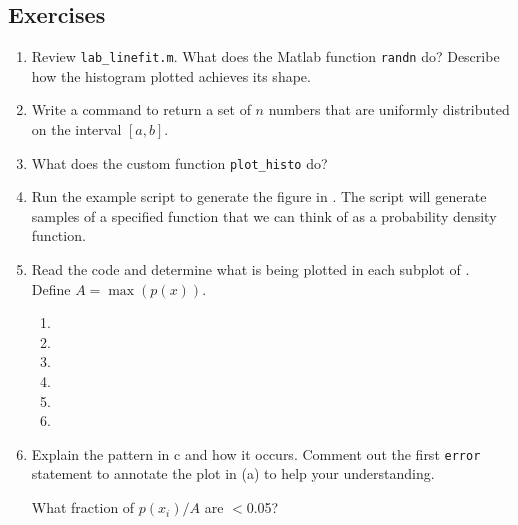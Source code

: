 \documentclass[11pt,titlepage,fleqn]{article}
\begin{document}




\pagebreak
\subsection*{Exercises}

\begin{enumerate}
\item Review \verb+lab_linefit.m+. What does the Matlab function \verb+randn+ do? Describe how the histogram plotted achieves its shape.

\vertgap

\item Write a command to return a set of $n$ numbers that are uniformly distributed on the interval $[a,b]$.

\vertgap

\item What does the custom function \verb+plot_histo+ do?

\vertgap

\item Run the example script to generate the figure in . The script will generate samples of a specified function that we can think of as a probability density function.

\item Read the code and determine what is being plotted in each subplot of . \\
Define $A = \max(p(x))$.
%
\begin{spacing}{2.0}
\begin{enumerate}
\item 
\item 
\item 
\item 
\item 
\item 
\end{enumerate}
\end{spacing}

\item Explain the pattern in c and how it occurs. Comment out the first \verb+error+ statement to annotate the plot in (a) to help your understanding.

What fraction of $p(x_i)/A$ are $<$0.05?


\end{enumerate}
\end{document}
